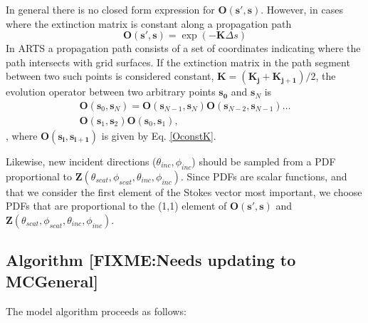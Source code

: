 In general there is no closed form expression for $\mathbf{O(s',s)}$.
However, in cases where the extinction matrix is constant along a
propagation path
\begin{equation}
\mathbf{O(s',s)}=\exp\left(-\mathbf{K}\Delta s\right)
\label{OconstK}
\end{equation}
In ARTS a propagation path consists of a set of coordinates
indicating where the path intersects with grid surfaces.  If the
extinction matrix in the path segment between two such points is
considered constant, $\mathbf{K}=(\mathbf{K_j}+\mathbf{K_{j+1}})/2$,
the evolution operator between two arbitrary points $\mathbf{s_0}$ and
$\mathbf{s}_N$ is
\begin{eqnarray}
\mathbf{O}(\mathbf{s}_0,\mathbf{s}_N) =
\mathbf{O}(\mathbf{s}_{N-1},\mathbf{s}_N)
\mathbf{O}(\mathbf{s}_{N-2},\mathbf{s}_{N-1}) \dots \nonumber\\
\mathbf{O}(\mathbf{s}_1,\mathbf{s}_2)\mathbf{O}(\mathbf{s}_0,\mathbf{s}_1),
\end{eqnarray}
, where $\mathbf{O(s_i,s_{i+1})}$ is given by Eq. \ref{OconstK}.




Likewise, new incident directions
($\theta_{inc},\phi_{inc}$) should be sampled from a PDF proportional
to
$\mathbf{Z}(\theta_{scat},\phi_{scat},\theta_{inc},\phi_{inc})$.
Since PDFs are scalar functions, and that we consider the first element of the
Stokes vector most important, we choose PDFs that are proportional to the
(1,1) element of $\mathbf{O(s',s)}$ and $\mathbf{Z}(\theta_{scat},\phi_{scat},\theta_{inc},\phi_{inc})$. 
\subsection{Algorithm [FIXME:Needs updating to MCGeneral]}
 \label{sec:montecarlo:alg}
The model algorithm proceeds as follows:

